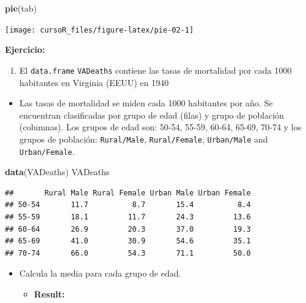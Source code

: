 \documentclass[]{book}
\newenvironment{Shaded}{\begin{snugshade}}{\end{snugshade}}
\newcommand{\KeywordTok}[1]{\textcolor[rgb]{0.13,0.29,0.53}{\textbf{#1}}}
\newcommand{\NormalTok}[1]{#1}
\providecommand{\tightlist}{%
  \setlength{\itemsep}{0pt}\setlength{\parskip}{0pt}}
\begin{document}
\begin{Shaded}
\begin{Highlighting}[]
\KeywordTok{pie}\NormalTok{(tab)}
\end{Highlighting}
\end{Shaded}

\begin{center}\texttt{[image: cursoR\_files/figure-latex/pie-02-1]} \end{center}

\textbf{Ejercicio:}

\begin{enumerate}
\def\labelenumi{\arabic{enumi}.}
\tightlist
\item
  El \texttt{data.frame} \texttt{VADeaths} contiene las tasas de
  mortalidad por cada 1000 habitantes en Virginia (EEUU) en 1940
\end{enumerate}

\begin{itemize}
\tightlist
\item
  Las tasas de mortalidad se miden cada 1000 habitantes por año. Se
  encuentran clasificadas por grupo de edad (filas) y grupo de población
  (columnas). Los grupos de edad son: 50-54, 55-59, 60-64, 65-69, 70-74
  y los grupos de población: \texttt{Rural/Male}, \texttt{Rural/Female},
  \texttt{Urban/Male} and \texttt{Urban/Female}.
\end{itemize}

\begin{Shaded}
\begin{Highlighting}[]
\KeywordTok{data}\NormalTok{(VADeaths)}
\NormalTok{VADeaths}
\end{Highlighting}
\end{Shaded}

\begin{verbatim}
##       Rural Male Rural Female Urban Male Urban Female
## 50-54       11.7          8.7       15.4          8.4
## 55-59       18.1         11.7       24.3         13.6
## 60-64       26.9         20.3       37.0         19.3
## 65-69       41.0         30.9       54.6         35.1
## 70-74       66.0         54.3       71.1         50.0
\end{verbatim}

\begin{itemize}
\item
  Calcula la media para cada grupo de edad.

  \begin{itemize}
  \tightlist
  \item
    \textbf{Result:}
  \end{itemize}
\end{itemize}
\end{document}
